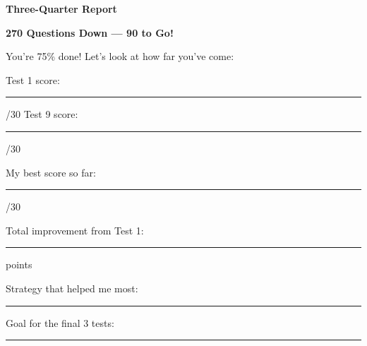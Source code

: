 \clearpage
\thispagestyle{empty}
{\sffamily

\begin{center}
{\fontsize{22}{26}\selectfont\bfseries\color{funBlue} \faChartArea\hspace{3mm}Three-Quarter Report\hspace{3mm}\faChartArea}

\vspace{2mm}
{\color{funGray}\hrulefill}
\end{center}

\vspace{3mm}

\begin{tcolorbox}[
    enhanced,
    colback=funBlueLight,
    colframe=funBlue!50,
    arc=10pt,
    boxrule=1.5pt,
    left=6mm, right=6mm, top=5mm, bottom=5mm,
]
{\large\bfseries\color{funBlueDark} \faPoll\hspace{2mm}270 Questions Down — 90 to Go!}

\vspace{2mm}

You're 75\% done! Let's look at how far you've come:

\vspace{3mm}

\faArrowRight\hspace{2mm}Test 1 score: \rule[-2pt]{1.2cm}{0.5pt}/30 \hfill Test 9 score: \rule[-2pt]{1.2cm}{0.5pt}/30

\vspace{2mm}

\faArrowRight\hspace{2mm}My best score so far: \rule[-2pt]{1.5cm}{0.5pt}/30

\vspace{2mm}

\faArrowRight\hspace{2mm}Total improvement from Test 1: \rule[-2pt]{2cm}{0.5pt} points

\vspace{2mm}

\faArrowRight\hspace{2mm}Strategy that helped me most: \rule[-2pt]{4.5cm}{0.5pt}

\vspace{2mm}

\faArrowRight\hspace{2mm}Goal for the final 3 tests: \rule[-2pt]{5cm}{0.5pt}
\end{tcolorbox}

}
